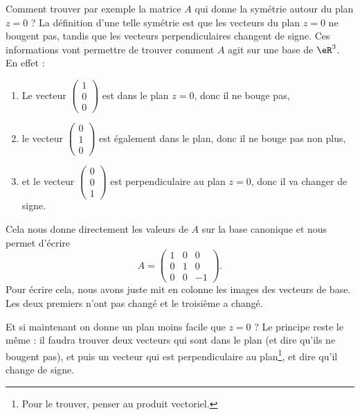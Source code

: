 Comment trouver par exemple la matrice $A$ qui donne la symétrie autour du plan $z=0$ ? La définition d'une telle symétrie est que les vecteurs du plan $z=0$ ne bougent pas, tandis que les vecteurs perpendiculaires changent de signe. Ces informations vont permettre de trouver comment $A$ agit sur une base de $\eR^3$. En effet :
\begin{enumerate}

	\item
		Le vecteur $\begin{pmatrix}
			1	\\
			0	\\
			0
		\end{pmatrix}$ est dans le plan $z=0$, donc il ne bouge pas,

	\item
		le vecteur $\begin{pmatrix}
			0	\\
			1	\\
			0
		\end{pmatrix}$ est également dans le plan, donc il ne bouge pas non plus,

	\item
		et le vecteur $\begin{pmatrix}
			0	\\
			0	\\
			1
		\end{pmatrix}$ est perpendiculaire au plan $z=0$, donc il va changer de signe.

\end{enumerate}
Cela nous donne directement les valeurs de $A$ sur la base canonique et nous permet d'écrire
\begin{equation}
	A=\begin{pmatrix}
		1	&	0	&	0	\\
		0	&	1	&	0	\\
		0	&	0	&	-1
	\end{pmatrix}.
\end{equation}
Pour écrire cela, nous avons juste mit en colonne les images des vecteurs de base. Les deux premiers n'ont pas changé et le troisième a changé.

Et si maintenant on donne un plan moins facile que $z=0$ ? Le principe reste le même : il faudra trouver deux vecteurs qui sont dans le plan (et dire qu'ils ne bougent pas), et puis un vecteur qui est perpendiculaire au plan\footnote{Pour le trouver, penser au produit vectoriel.}, et dire qu'il change de signe.

